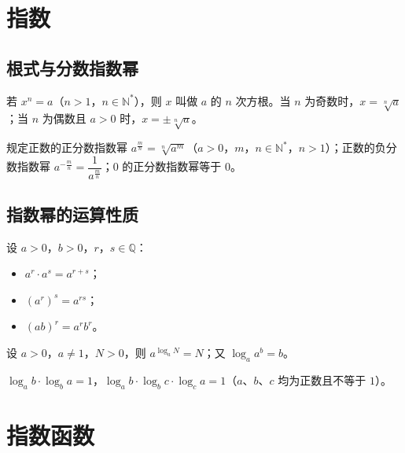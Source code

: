 
\section{指数}
\subsection{根式与分数指数幂}
\begin{definition}[根式]
若 $x^n=a$（$n>1$，$n \in \mathbb{N}^*$），则 $x$ 叫做 $a$ 的 $n$ 次方根。当 $n$ 为奇数时，$x=\sqrt[n]{a}$；当 $n$ 为偶数且 $a>0$ 时，$x=\pm\sqrt[n]{a}$。
\end{definition}
\begin{definition}[分数指数幂]
规定正数的正分数指数幂 $a^{\frac{m}{n}}=\sqrt[n]{a^m}$（$a>0$，$m$，$n \in \mathbb{N}^*$，$n>1$）；正数的负分数指数幂 $a^{-\frac{m}{n}}=\dfrac{1}{a^{\frac{m}{n}}}$；$0$ 的正分数指数幂等于 $0$。
\end{definition}
\subsection{指数幂的运算性质}
\begin{definition}[指数幂的运算性质]
设 $a>0$，$b>0$，$r$，$s \in \mathbb{Q}$：
\begin{itemize}
    \item $a^r \cdot a^s=a^{r+s}$；
    \item $(a^r)^s=a^{rs}$；
    \item $(ab)^r=a^r b^r$。
\end{itemize}
\end{definition}
\begin{theorem}[对数恒等式]
设 $a>0$，$a \neq 1$，$N>0$，则 $a^{\log_a N}=N$；又 $\log_a a^b=b$。
\end{theorem}
\begin{corollary}[对数换底推论]
$\log_a b \cdot \log_b a=1$，$\log_a b \cdot \log_b c \cdot \log_c a=1$（$a$、$b$、$c$ 均为正数且不等于 $1$）。
\end{corollary}

\section{指数函数}
